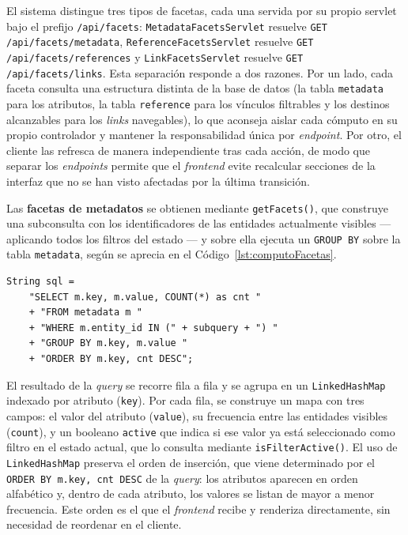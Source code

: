 El sistema distingue tres tipos de facetas, cada una servida por su propio servlet
bajo el prefijo \texttt{/api/facets}: \texttt{Metadata\allowbreak FacetsServlet} resuelve
\texttt{GET /api/\allowbreak facets/\allowbreak metadata}, \texttt{Reference\allowbreak FacetsServlet}
resuelve \texttt{GET /api/\allowbreak facets/\allowbreak references} y
\texttt{Link\allowbreak FacetsServlet} resuelve
\texttt{GET /api/\allowbreak facets/\allowbreak links}. Esta separación responde a dos razones. Por un lado,
cada faceta consulta una estructura distinta de la base de datos (la tabla
\texttt{metadata} para los atributos, la tabla \texttt{reference} para los vínculos
filtrables y los destinos alcanzables para los \textit{links} navegables), lo que
aconseja aislar cada cómputo en su propio controlador y mantener la responsabilidad
única por \textit{endpoint}. Por otro, el cliente las refresca de manera independiente tras
cada acción, de modo que separar los \textit{endpoints} permite que el \textit{frontend} evite recalcular
secciones de la interfaz que no se han visto afectadas por la última transición.

Las \textbf{facetas de metadatos} se obtienen mediante \texttt{getFacets()}, que construye
una subconsulta con los identificadores de las entidades actualmente visibles
--- aplicando todos los filtros del estado --- y sobre ella ejecuta un \texttt{GROUP BY}
sobre la tabla \texttt{metadata}, según se aprecia en el
Código~\ref{lst:computoFacetas}.

\begin{lstlisting}[style=javaStyle, caption=Cómputo dinámico de facetas, label=lst:computoFacetas]
String sql =
    "SELECT m.key, m.value, COUNT(*) as cnt "
    + "FROM metadata m "
    + "WHERE m.entity_id IN (" + subquery + ") "
    + "GROUP BY m.key, m.value "
    + "ORDER BY m.key, cnt DESC";
\end{lstlisting}

El resultado de la \textit{query} se recorre fila a fila y se agrupa en un \texttt{LinkedHashMap}
indexado por atributo (\texttt{key}). Por cada fila, se construye un mapa con tres
campos: el valor del atributo (\texttt{value}), su frecuencia entre las entidades
visibles (\texttt{count}), y un booleano \texttt{active} que indica si ese valor ya
está seleccionado como filtro en el estado actual, que lo consulta mediante
\texttt{isFilterActive()}. El uso de \texttt{LinkedHashMap} preserva el orden de
inserción, que viene determinado por el \texttt{ORDER BY m.key, cnt DESC} de la \textit{query}:
los atributos aparecen en orden alfabético y, dentro de cada atributo, los valores se
listan de mayor a menor frecuencia. Este orden es el que el \textit{frontend} recibe y renderiza
directamente, sin necesidad de reordenar en el cliente.

